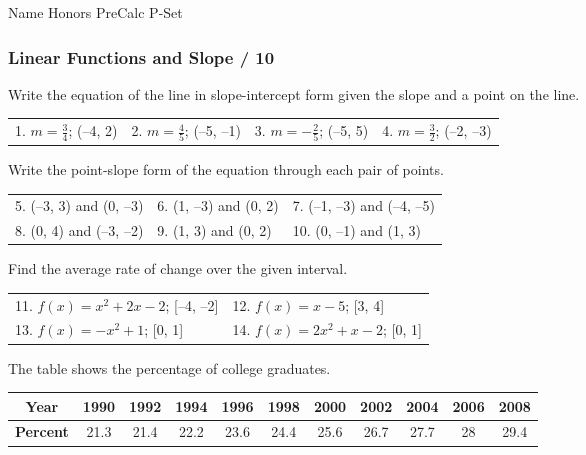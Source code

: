 \documentclass[11pt]{article}
\begin{document}
Name \makebox[2.5in]{\hrulefill}    \hfill  Honors PreCalc P-Set

\subsubsection*{Linear Functions and Slope \hfill \makebox[0.35in]{\hrulefill} / 10}

Write the equation of the line in slope-intercept form given the slope and a point on the line.
\newline\\


\begin{tabular}{p{}p{}p{}p{}}
1. $m=\frac{3}{4}$;  (--4, 2)    &
2. $m=\frac{4}{5}$;  (--5, --1)  &
3. $m=-\frac{2}{5}$;  (--5, 5)  &
4. $m=\frac{3}{2}$;  (--2, --3) \\[1.5in]
\end{tabular}

Write the point-slope form of the equation
through each pair of points.
\newline\\

\begin{tabular}{p{}p{}p{}}
5. (--3, 3) and (0, --3)    &
6. (1, --3) and (0, 2)      &
7. (--1, --3) and (--4, --5)    \\[1.75in]
8. (0, 4) and (--3, --2)    &
9. (1, 3) and (0, 2)        &
10. (0, --1) and (1, 3)     \\[1.75in]
\end{tabular}


Find the average rate of change over the given interval.
\newline\\


\begin{tabular}{p{}p{}}
11. $f(x)=x^2+2x-2$; [--4, --2]     &
12. $f(x)=x-5$; [3, 4]      \\[1.25in]
13. $f(x)=-x^2+1$; [0, 1]   &
14. $f(x)=2x^2+x-2$; [0, 1] \\
\end{tabular}

\newpage

The table shows the percentage of college graduates. 
\newline\\

\setlength{\extrarowheight}{3pt}
\begin{tabular}{|c|c|c|c|c|c|c|c|c|c|c|}
\hline
\textbf{Year}    &   1990    &   1992    &   1994    &   1996   &   1998    &   2000    &   2002    &   2004   &   2006    &   2008    \\[3pt] \hline
\textbf{Percent} &   21.3    &   21.4    &   22.2    &   23.6   &   24.4    &   25.6    &   26.7    &   27.7   &   28  &   29.4    \\[3pt]  \hline
\end{tabular}
\bigskip
\end{document}
